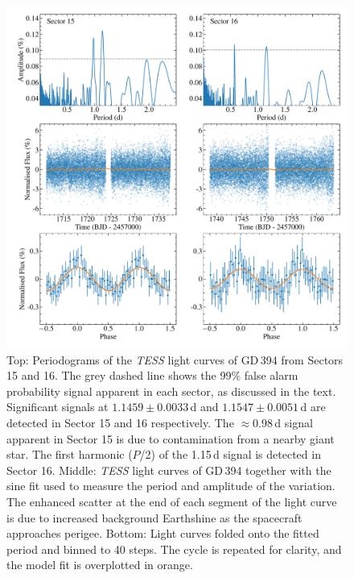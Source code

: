 \documentclass{aastex63}
\begin{document}
\begin{figure}
    \centering
    \includegraphics[width=\columnwidth]{gd394_tess_full.pdf}
    \caption{Top: Periodograms of the \textit{TESS} light curves of GD\,394 from Sectors 15 and 16. The grey dashed line shows the 99\% false alarm probability signal apparent in each sector, as discussed in the text. Significant signals at $1.1459\pm0.0033$\,d and $1.1547\pm0.0051$\,d  are detected in Sector 15 and 16 respectively. The $\approx 0.98$\,d signal apparent in Sector 15 is due to contamination from a nearby giant star. The first harmonic ($P$/2) of the 1.15\,d signal is detected in Sector 16. Middle: \textit{TESS} light curves of GD\,394 together with the sine fit used to measure the period and amplitude of the variation. The enhanced scatter at the end of each segment of the light curve is due to increased background Earthshine as the spacecraft approaches perigee. Bottom: Light curves folded onto the fitted period and binned to 40 steps. The cycle is repeated for clarity, and the model fit is overplotted in orange. }
    \label{fig:all_obs}
\end{figure}


\end{document}

